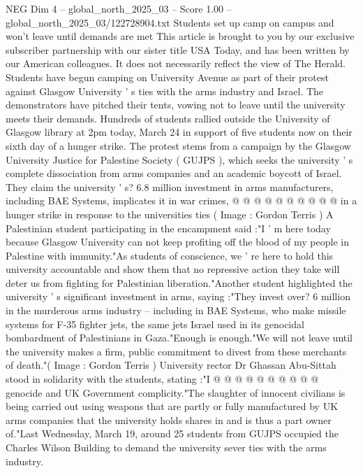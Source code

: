 \begin{textsample}{NEG Dim 4 – global\_north\_2025\_03 – Score 1.00 – global\_north\_2025\_03/122728904.txt}  \label{ex:f4_neg_397}
Students set up camp on campus and won't leave until demands are met This article is brought to you by our exclusive subscriber partnership with our sister title USA Today, and has been written by our American colleagues.
It does not necessarily reflect the view of The Herald.
Students have begun camping on University Avenue as part of their protest against Glasgow University ' s ties with the arms industry and Israel.
The demonstrators have pitched their tents, vowing not to leave until the university meets their demands.
Hundreds of students rallied outside the University of Glasgow library at 2pm today, March 24 in support of five students now on their sixth day of a hunger strike.
The protest stems from a campaign by the Glasgow University Justice for Palestine Society ( GUJPS ), which seeks the university ' s complete dissociation from arms companies and an academic boycott of Israel.
They claim the university ' s? 6.8 million investment in arms manufacturers, including BAE Systems, implicates it in war crimes, @ @ @ @ @ @ @ @ @ @ in a hunger strike in response to the universities ties ( Image : Gordon Terris ) A Palestinian student participating in the encampment said :"I ' m here today because Glasgow University can not keep profiting off the blood of my people in Palestine with immunity."As students of conscience, we ' re here to hold this university accountable and show them that no repressive action they take will deter us from fighting for Palestinian liberation."Another student highlighted the university ' s significant investment in arms, saying :"They invest over? 6 million in the murderous arms industry -- including in BAE Systems, who make missile systems for F-35 fighter jets, the same jets Israel used in its genocidal bombardment of Palestinians in Gaza."Enough is enough."We will not leave until the university makes a firm, public commitment to divest from these merchants of death."( Image : Gordon Terris ) University rector Dr Ghassan Abu-Sittah stood in solidarity with the students, stating :"I @ @ @ @ @ @ @ @ @ @ genocide and UK Government complicity."The slaughter of innocent civilians is being carried out using weapons that are partly or fully manufactured by UK arms companies that the university holds shares in and is thus a part owner of."Last Wednesday, March 19, around 25 students from GUJPS occupied the Charles Wilson Building to demand the university sever ties with the arms industry.

\end{textsample}
